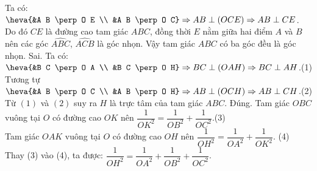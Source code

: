 \begin{ex}
{\begin{itemchoice}
			Ta có: $\heva{&A B \perp O E \\ &A B \perp O C} \Rightarrow A B \perp(O C E) \Rightarrow A B \perp C E$.\\
			Do đó $C E$ là đường cao tam giác $A B C$, đồng thời $E$ nằm giữa hai điểm $A$ và $B$ nên các góc $\widehat{ABC}$, $\widehat{ACB}$ là góc nhọn.
			Vậy tam giác $A B C$ có ba góc đều là góc nhọn.
			\itemch Sai. Ta có: $\heva{&B C \perp O A \\ &B C \perp O H} \Rightarrow B C \perp(O A H) \Rightarrow B C \perp A H$.\hfill{(1)}\\
			Tương tự $\heva{&A B \perp O C \\ &A B \perp O H} \Rightarrow A B \perp(O C H) \Rightarrow A B \perp C H$.\hfill{(2)}\\
			Từ $(1)$ và $(2)$ suy ra $H$ là trực tâm của tam giác $A B C$.
			\itemch Đúng. Tam giác $O B C$ vuông tại $O$ có đường cao $O K$ nên $\dfrac{1}{O K^2}=\dfrac{1}{O B^2}+\dfrac{1}{O C^2}$.\hfill{(3)}\\
			Tam giác $O A K$ vuông tại $O$ có đường cao $O H$ nên $\dfrac{1}{O H^2}=\dfrac{1}{O A^2}+\dfrac{1}{O K^2}$. \hfill{(4)}\\ Thay (3) vào (4), ta được: $\dfrac{1}{O H^2}=\dfrac{1}{O A^2}+\dfrac{1}{O B^2}+\dfrac{1}{O C^2}$.
		\end{itemchoice}
	}
\end{ex}
